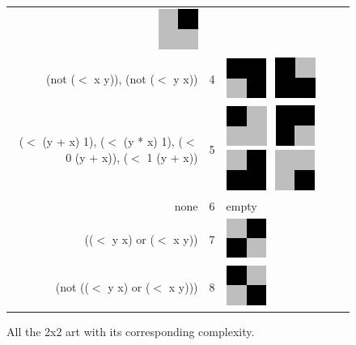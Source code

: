 \documentclass[11pt]{article}
\begin{document}
{\begin{figure}
\begin{center}
\begin{tabular}{r c l}
    \includegraphics[width=.25in]{../presentation/2x2/Shape4LVL3.png}\\
\tiny{(not ($<$ x y)), (not ($<$ y x))} & 4 & 
    \includegraphics[width=.25in]{../presentation/2x2/Shape2LVL4.png}~
    \includegraphics[width=.25in]{../presentation/2x2/Shape1LVL4.png} \\
\tiny{($<$ (y + x) 1), ($<$ (y * x) 1), ($<$ 0 (y + x)), ($<$ 1 (y + x))} & 5 & 
    \includegraphics[width=.25in]{../presentation/2x2/Shape2LVL5.png}~
    \includegraphics[width=.25in]{../presentation/2x2/Shape1LVL5.png}~
    \includegraphics[width=.25in]{../presentation/2x2/Shape3LVL5.png}~
    \includegraphics[width=.25in]{../presentation/2x2/Shape4LVL5.png} \\
\tiny{none} & 6 & empty \\
\tiny{(($<$ y  x) or ($<$ x  y))} & 7 &
    \includegraphics[width=.25in]{../presentation/2x2/Shape1LVL7.png}\\
\tiny{(not (($<$ y  x) or ($<$ x  y)))} & 8 &
    \includegraphics[width=.25in]{../presentation/2x2/Shape1LVL8.png}
\end{tabular}
\end{center}

\caption{All the 2x2 art with its corresponding complexity.}
\end{figure}


}
\end{document}
